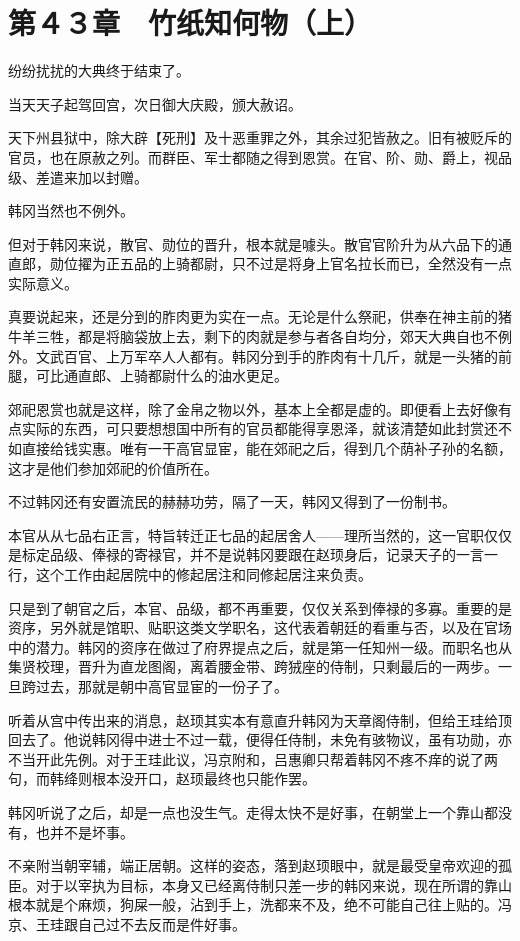 \section{第４３章　竹纸知何物（上）}

纷纷扰扰的大典终于结束了。

当天天子起驾回宫，次日御大庆殿，颁大赦诏。

天下州县狱中，除大辟【死刑】及十恶重罪之外，其余过犯皆赦之。旧有被贬斥的官员，也在原赦之列。而群臣、军士都随之得到恩赏。在官、阶、勋、爵上，视品级、差遣来加以封赠。

韩冈当然也不例外。

但对于韩冈来说，散官、勋位的晋升，根本就是噱头。散官官阶升为从六品下的通直郎，勋位擢为正五品的上骑都尉，只不过是将身上官名拉长而已，全然没有一点实际意义。

真要说起来，还是分到的胙肉更为实在一点。无论是什么祭祀，供奉在神主前的猪牛羊三牲，都是将脑袋放上去，剩下的肉就是参与者各自均分，郊天大典自也不例外。文武百官、上万军卒人人都有。韩冈分到手的胙肉有十几斤，就是一头猪的前腿，可比通直郎、上骑都尉什么的油水更足。

郊祀恩赏也就是这样，除了金帛之物以外，基本上全都是虚的。即便看上去好像有点实际的东西，可只要想想国中所有的官员都能得享恩泽，就该清楚如此封赏还不如直接给钱实惠。唯有一干高官显宦，能在郊祀之后，得到几个荫补子孙的名额，这才是他们参加郊祀的价值所在。

不过韩冈还有安置流民的赫赫功劳，隔了一天，韩冈又得到了一份制书。

本官从从七品右正言，特旨转迁正七品的起居舍人——理所当然的，这一官职仅仅是标定品级、俸禄的寄禄官，并不是说韩冈要跟在赵顼身后，记录天子的一言一行，这个工作由起居院中的修起居注和同修起居注来负责。

只是到了朝官之后，本官、品级，都不再重要，仅仅关系到俸禄的多寡。重要的是资序，另外就是馆职、贴职这类文学职名，这代表着朝廷的看重与否，以及在官场中的潜力。韩冈的资序在做过了府界提点之后，就是第一任知州一级。而职名也从集贤校理，晋升为直龙图阁，离着腰金带、跨狨座的侍制，只剩最后的一两步。一旦跨过去，那就是朝中高官显宦的一份子了。

听着从宫中传出来的消息，赵顼其实本有意直升韩冈为天章阁侍制，但给王珪给顶回去了。他说韩冈得中进士不过一载，便得任侍制，未免有骇物议，虽有功勋，亦不当开此先例。对于王珪此议，冯京附和，吕惠卿只帮着韩冈不疼不痒的说了两句，而韩绛则根本没开口，赵顼最终也只能作罢。

韩冈听说了之后，却是一点也没生气。走得太快不是好事，在朝堂上一个靠山都没有，也并不是坏事。

不亲附当朝宰辅，端正居朝。这样的姿态，落到赵顼眼中，就是最受皇帝欢迎的孤臣。对于以宰执为目标，本身又已经离侍制只差一步的韩冈来说，现在所谓的靠山根本就是个麻烦，狗屎一般，沾到手上，洗都来不及，绝不可能自己往上贴的。冯京、王珪跟自己过不去反而是件好事。

